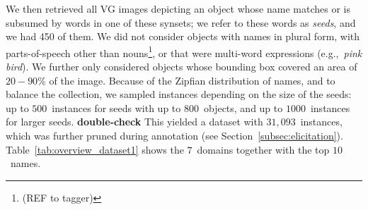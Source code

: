 We then retrieved all VG images depicting an object whose name matches or is subsumed by words in one of these synsets; we refer to these words as \textit{seeds}, and we had 450 of them.
We did not consider objects with names in plural form, with parts-of-speech other than nouns\footnote{(REF to tagger)}, or that were multi-word expressions (e.g.,~\textsl{pink bird}). 
We further only considered objects whose bounding box covered an area of~$20-90\%$ of the image.
Because of the Zipfian distribution of names, and to balance the collection, we sampled instances depending on the size of the seeds: up to $500$\ instances for seeds with up to $800$\ objects, and up to $1000$\ instances for larger seeds. \textbf{double-check}
This yielded a dataset with $31,093$~instances, which was further pruned during annotation (see Section\ \ref{subsec:elicitation}). 
Table~\ref{tab:overview_dataset1} shows the $7$\ domains together with the top $10$\ \vg names.

